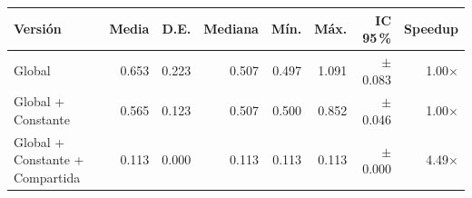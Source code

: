 \begin{tabular}{lrrrrrrr}
\toprule
Versión & Media & D.E. & Mediana & Mín. & Máx. & IC 95\,\% & Speedup \\
\midrule
Global & 0.653 & 0.223 & 0.507 & 0.497 & 1.091 & $\pm$0.083 & 1.00$\times$ \\
Global + Constante & 0.565 & 0.123 & 0.507 & 0.500 & 0.852 & $\pm$0.046 & 1.00$\times$ \\
Global + Constante + Compartida & 0.113 & 0.000 & 0.113 & 0.113 & 0.113 & $\pm$0.000 & 4.49$\times$ \\
\bottomrule
\end{tabular}
